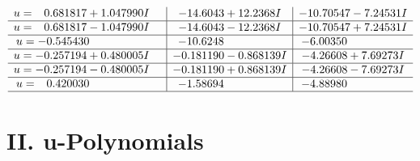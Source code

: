 \documentclass[1p]{elsarticle_modified}
\theoremstyle{definition}
\begin{document}
$$\begin{array}{c|c|c}
\begin{aligned}
u &= \phantom{-}0.681817 + 1.047990 I\end{aligned}
 & -14.6043 + 12.2368 I & -10.70547 - 7.24531 I \\ \hline\begin{aligned}
u &= \phantom{-}0.681817 - 1.047990 I\end{aligned}
 & -14.6043 - 12.2368 I & -10.70547 + 7.24531 I \\ \hline\begin{aligned}
u &= -0.545430\phantom{ +0.000000I}\end{aligned}
 & -10.6248\phantom{ +0.000000I} & -6.00350\phantom{ +0.000000I} \\ \hline\begin{aligned}
u &= -0.257194 + 0.480005 I\end{aligned}
 & -0.181190 - 0.868139 I & -4.26608 + 7.69273 I \\ \hline\begin{aligned}
u &= -0.257194 - 0.480005 I\end{aligned}
 & -0.181190 + 0.868139 I & -4.26608 - 7.69273 I \\ \hline\begin{aligned}
u &= \phantom{-}0.420030\phantom{ +0.000000I}\end{aligned}
 & -1.58694\phantom{ +0.000000I} & -4.88980\phantom{ +0.000000I}\\
 \hline 
 \end{array}$$\newpage
\newpage\renewcommand{\arraystretch}{1}
\centering \section*{ II. u-Polynomials}
\end{document}

